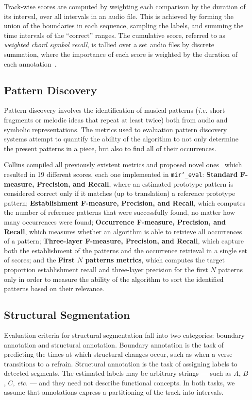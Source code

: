 \documentclass{article}
\def\ie{\emph{i.e.}}
\def\etc{\emph{etc.}}
\def\mireval{\texttt{mir\char`_eval}}
\begin{document}
Track-wise scores are computed by weighting each comparison by the duration of its interval, over all intervals in an audio file.
This is achieved by forming the union of the boundaries in each sequence, sampling the labels, and summing the time intervals of the ``correct'' ranges. 
The cumulative score, referred to as \emph{weighted chord symbol recall}, is tallied
over a set audio files by discrete summation, where the importance of each score is
weighted by the duration of each annotation~\cite{choi2013mirex}.
 
\subsection{Pattern Discovery}

Pattern discovery involves the identification of musical patterns (\ie{} short fragments or melodic ideas that repeat at least twice) both from audio and symbolic representations.
The metrics used to evaluation pattern discovery systems attempt to quantify the ability of the algorithm to not only determine the present patterns in a piece, but also to find all of their occurrences.

Collins compiled all previously existent metrics and proposed novel ones~\cite{Collins2013} which resulted in 19 different scores, each one implemented in \mireval{}:
\textbf{Standard F-measure, Precision, and Recall}, where an estimated prototype pattern is considered correct only if it matches (up to translation) a reference prototype pattern;
\textbf{Establishment F-measure, Precision, and Recall}, which computes the number of reference patterns that were successfully found, no matter how many occurrences were found;
\textbf{Occurrence F-measure, Precision, and Recall}, which measures whether an algorithm is able to retrieve all occurrences of a pattern;
\textbf{Three-layer F-measure, Precision, and Recall}, which capture both the establishment of the patterns and the occurrence retrieval in a single set of scores;
and the \textbf{First $N$ patterns metrics}, which computes the target proportion establishment recall and three-layer precision for the first $N$ patterns only in order to measure the ability of the algorithm to sort the identified patterns based on their relevance. 

\subsection{Structural Segmentation}

Evaluation criteria for structural segmentation fall into two categories: boundary annotation and structural annotation.
Boundary annotation is the task of predicting the times at which structural changes occur, such as when a verse transitions to a refrain.
Structural annotation is the task of assigning labels to detected segments.
The estimated labels may be arbitrary strings --- such as $A$, $B$, $C$, \etc{} --- and they need not describe functional concepts.
In both tasks, we assume that annotations express a partitioning of the track into intervals.
\end{document}
